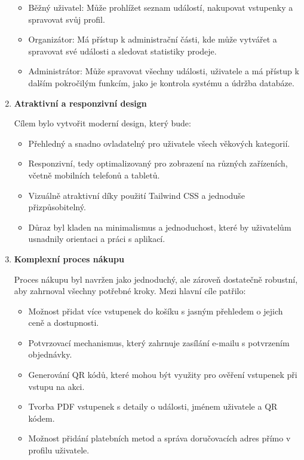 \documentclass[12pt, a4paper,
twoside,        %
openright
]{report}
\begin{document}
\begin{enumerate}
\begin{itemize}
	
	\item Běžný uživatel: Může prohlížet seznam událostí, nakupovat vstupenky a spravovat svůj profil.
	\item Organizátor: Má přístup k administrační části, kde může vytvářet a spravovat své události a sledovat statistiky prodeje.
	\item Administrátor: Může spravovat všechny události, uživatele a má přístup k dalším pokročilým funkcím, jako je kontrola systému a údržba databáze.
	
\end{itemize}

\item \textbf{Atraktivní a responzivní design}

Cílem bylo vytvořit moderní design, který bude:

\begin{itemize}

	\item Přehledný a snadno ovladatelný pro uživatele všech věkových kategorií.
	\item Responzivní, tedy optimalizovaný pro zobrazení na různých zařízeních, včetně mobilních telefonů a tabletů.
	\item Vizuálně atraktivní díky použití Tailwind CSS a jednoduše přizpůsobitelný.
	\item Důraz byl kladen na minimalismus a jednoduchost, které by uživatelům usnadnily orientaci a práci s aplikací.

\end{itemize}

\clearpage

\item \textbf{Komplexní proces nákupu}

Proces nákupu byl navržen jako jednoduchý, ale zároveň dostatečně robustní, aby zahrnoval všechny potřebné kroky. Mezi hlavní cíle patřilo:

\begin{itemize}

\item Možnost přidat více vstupenek do košíku s jasným přehledem o jejich ceně a dostupnosti.
\item Potvrzovací mechanismus, který zahrnuje zasílání e-mailu s potvrzením objednávky.
\item Generování QR kódů, které mohou být využity pro ověření vstupenek při vstupu na akci.
\item Tvorba PDF vstupenek s detaily o události, jménem uživatele a QR kódem.
\item Možnost přidání platebních metod a správa doručovacích adres přímo v profilu uživatele.


\end{itemize}
\end{enumerate}
\end{document}
